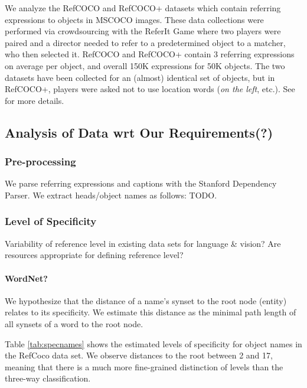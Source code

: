 {We analyze the RefCOCO and RefCOCO+ datasets which contain referring expressions to objects in MSCOCO \cite{mscoco} images.
These data collections were performed via crowdsourcing with the ReferIt Game \cite{Kazemzadeh2014}  where two players were paired and a director needed to refer to a predetermined object to a matcher, who then selected it.
RefCOCO and RefCOCO+ contain 3 referring expressions on average per object, and overall 150K expressions for 50K objects. 
The two datasets have been collected for an (almost) identical set of objects, but in RefCOCO+, players were asked not to use location words (\textit{on the left}, etc.).
See \cite{Yu2016} for more details. 


\subsection{}


\subsection{Analysis of Data wrt Our Requirements(?)}

\subsubsection{Pre-processing}
We parse referring expressions and captions with the Stanford Dependency Parser.
We extract heads/object names as follows: TODO.

\subsubsection{Level of Specificity} 
Variability of reference level in existing data sets for language \& vision?
Are resources appropriate for defining reference level?
\paragraph{WordNet?}

We hypothesize that the distance of a name's synset to the root node (entity) relates to its specificity.
We estimate this distance as the minimal path length of all synsets of a word  to the root node.

Table \ref{tab:specnames} shows the estimated levels of specificity for object names in the RefCoco data set.
We observe distances to the root between 2 and 17, meaning that there is a much more fine-grained distinction of levels than the three-way classification.

}
